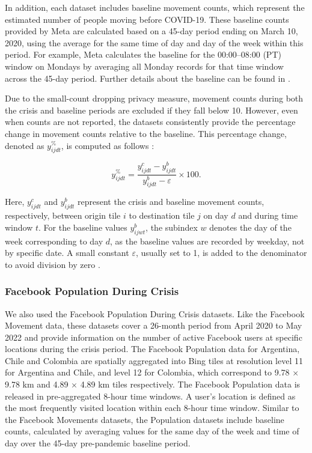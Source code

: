\documentclass[fleqn,10pt]{wlscirep}
\begin{document}
In addition, each dataset includes baseline movement counts, which represent the estimated number of people moving before COVID-19. These baseline counts provided by Meta are calculated based on a 45-day period ending on March 10, 2020, using the average for the same time of day and day of the week within this period. For example, Meta calculates the baseline for the 00:00–08:00 (PT) window on Mondays by averaging all Monday records for that time window across the 45-day period. Further details about the baseline can be found in \cite{Maas19}.

Due to the small-count dropping privacy measure, movement counts during both the crisis and baseline periods are excluded if they fall below 10. However, even when counts are not reported, the datasets consistently provide the percentage change in movement counts relative to the baseline. This percentage change, denoted as $y^{\%}_{ijdt}$, is computed as follows \cite{Maas19}:

\begin{equation}
y^{\%}_{ijdt} = \dfrac{y^{c}_{ijdt} - y^b_{ijdt}}{y^b_{ijdt} - \varepsilon}\times 100.
\end{equation}

Here, $y^c_{ijdt}$ and $y^b_{ijdt}$ represent the crisis and baseline movement counts, respectively, between origin tile $i$ to destination tile $j$ on day $d$ and during time window $t$. For the baseline values $y^b_{ijwt}$, the subindex $w$ denotes the day of the week corresponding to day $d$, as the baseline values are recorded by weekday, not by specific date. A small constant $\varepsilon$, usually set to 1, is added to the denominator to avoid division by zero \cite{Maas19}.

\subsubsection*{Facebook Population During Crisis}

We also used the Facebook Population During Crisis datasets. Like the Facebook Movement data, these datasets cover a 26-month period from April 2020 to May 2022 and provide information on the number of active Facebook users at specific locations during the crisis period. The Facebook Population data for Argentina, Chile and Colombia are spatially aggregated into Bing tiles at resolution level 11 for Argentina and Chile, and level 12 for Colombia, which correspond to 9.78 $\times$ 9.78 km and 4.89 $\times$ 4.89 km tiles respectively. The Facebook Population data is released in pre-aggregated 8-hour time windows. A user's location is defined as the most frequently visited location within each 8-hour time window. Similar to the Facebook Movements datasets, the Population datasets include baseline counts, calculated by averaging values for the same day of the week and time of day over the 45-day pre-pandemic baseline period.
\end{document}
